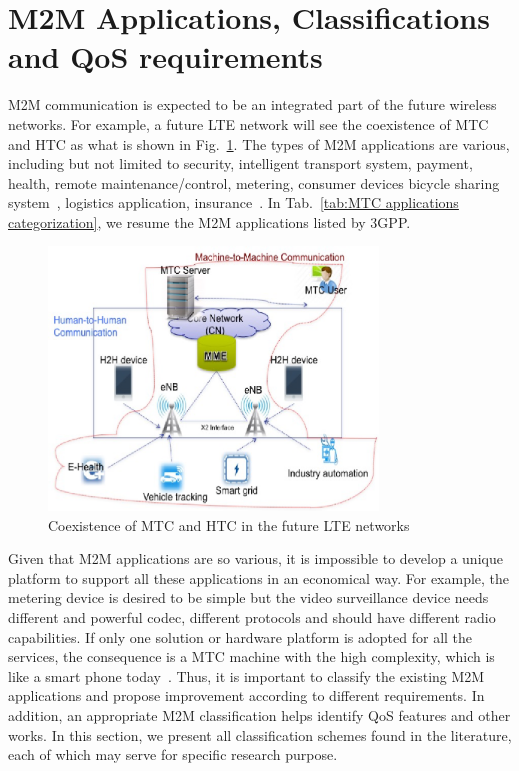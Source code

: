 \section{M2M Applications, Classifications and QoS requirements}
\label{sec:overview-m2m-app-class}
M2M communication is expected to be an integrated part of the future wireless networks. For example, a future LTE network will see the coexistence of MTC and HTC as what is shown in Fig.~\ref{fig:mtc-in-lte-use-case}. The types of M2M applications are various, including but not limited to security, intelligent transport system, payment, health, remote maintenance/control, metering, consumer devices bicycle sharing system~\cite{OECD/Report}, logistics application, insurance~\cite{OECD/Report}. In Tab.~\ref{tab:MTC applications categorization}, we resume the M2M applications listed by 3GPP.
\begin{figure}[h]
	\centering
	\includegraphics[width=0.7\linewidth, height=7cm]{Chapter2/Figures/MTC_use_case}
	\caption{Coexistence of MTC and HTC in the future LTE networks}
	\label{fig:mtc-in-lte-use-case}
\end{figure}

Given that M2M applications are so various, it is impossible to develop a unique platform to support all these applications in an economical way. For example, the metering device is desired to be simple but the video surveillance device needs different and powerful codec, different protocols and should have different radio capabilities. If only one solution or hardware platform is adopted for all the services, the consequence is a MTC machine with the high complexity, which is like a smart phone today~\cite{ChenY10machine}. Thus, it is important to classify the existing M2M applications and propose improvement according to different requirements. In addition, an appropriate M2M classification helps identify QoS features and other works. 
In this section, we present all classification schemes found in the literature, each of which may serve for specific research purpose. 


